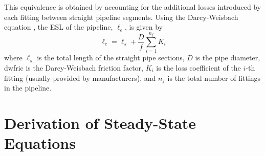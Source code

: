 This equivalence is obtained by accounting for the additional losses introduced by each fitting between straight pipeline segments. Using the Darcy-Weisbach equation \cite[pp.~238-242]{mott2006}, the ESL of the pipeline, $\ell_e$, is given by
\begin{equation*}
\ell_e = \ell_s + \frac{D}{f}\sum_{i=1}^{n_f} K_i
\end{equation*}
where $\ell_s$ is the total length of the straight pipe sections, $D$ is the pipe diameter, \gls{dwfric} is the Darcy-Weisbach friction factor, $K_i$ is the loss coefficient of the $i$-th fitting (usually provided by manufacturers), and $n_f$ is the total number of fittings in the pipeline.

\section{Derivation of Steady-State Equations}

